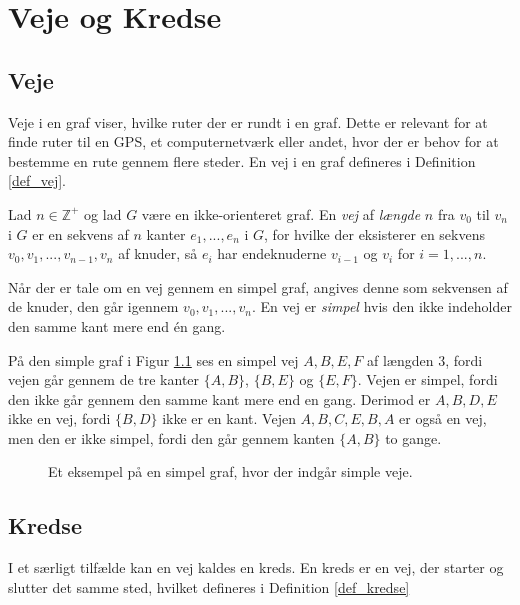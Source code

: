 \chapter{Veje og Kredse} \label{chap:paths_and_circuts}

\section{Veje}
Veje i en graf viser, hvilke ruter der er rundt i en graf. Dette er relevant for at finde ruter til en GPS, et computernetværk eller andet, hvor der er behov for at bestemme en rute gennem flere steder. 
En vej i en graf defineres i Definition \ref{def_vej}.

\begin{defn} \label{def_vej}
	Lad $n \in  \mathbb{Z}^{+}$ og lad $G$ være en ikke-orienteret graf. 
	En \textit{vej} af \textit{længde} $n$ fra $v_0$ til $v_n$ i $G$ er en sekvens af $n$ kanter $e_1, ..., e_n$ i $G$, for hvilke der eksisterer en sekvens $v_0,v_1,...,v_{n-1},v_n$ af knuder, så $e_i$ har endeknuderne $v_{i-1}$ og $v_i$ for $i=1,...,n$.
\end{defn}

Når der er tale om en vej gennem en simpel graf, angives denne som sekvensen af de knuder, den går igennem $v_0, v_1,...,v_n$. 
En vej er \textit{simpel} hvis den ikke indeholder den samme kant mere end én gang. 

\begin{exmp} \label{ex_vej}
	På den simple graf i Figur \ref{graf_vej} ses en simpel vej $A,B,E,F$ af længden 3, fordi vejen går gennem de tre kanter $\lbrace A,B \rbrace$, $\lbrace B,E \rbrace$ og $\lbrace E,F \rbrace$. 
	Vejen er simpel, fordi den ikke går gennem den samme kant mere end en gang. 
	Derimod er $A,B,D,E$ ikke en vej, fordi $\lbrace B,D \rbrace$ ikke er en kant. 
	Vejen $A,B,C,E,B,A$ er også en vej, men den er ikke simpel, fordi den går gennem kanten $\lbrace A,B \rbrace$ to gange. 
\end{exmp}

\begin{figure}[h]
	\centering
	
	\caption{Et eksempel på en simpel graf, hvor der indgår simple veje.} \label{graf_vej}
\end{figure}

\section{Kredse}
I et særligt tilfælde kan en vej kaldes en kreds.
En kreds er en vej, der starter og slutter det samme sted, hvilket defineres i Definition \ref{def_kredse}

